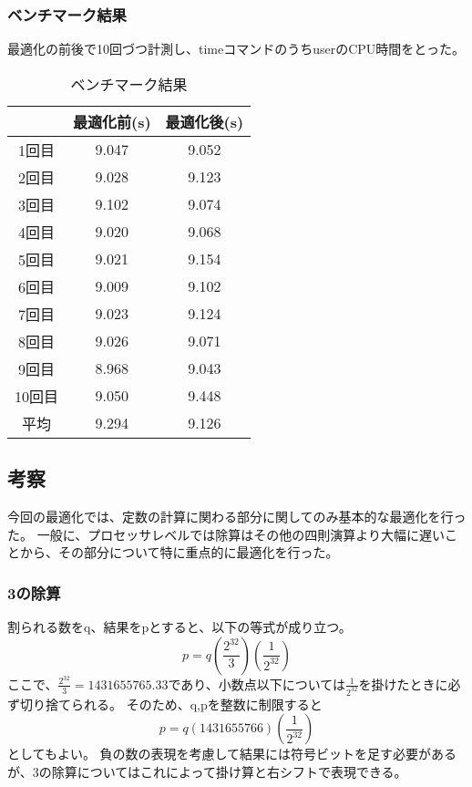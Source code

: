 \subsubsection{ベンチマーク結果}
最適化の前後で10回づつ計測し、timeコマンドのうちuserのCPU時間をとった。
\begin{table}[H]
  \centering
  \label{ベンチマーク結果}
  \caption{ベンチマーク結果}
  \begin{tabular}{|c|c|c|}
    \hline
           & 最適化前(s) & 最適化後(s) \\ \hline
    1回目  & 9.047       & 9.052       \\ \hline
    2回目  & 9.028       & 9.123       \\ \hline
    3回目  & 9.102       & 9.074       \\ \hline
    4回目  & 9.020       & 9.068       \\ \hline
    5回目  & 9.021       & 9.154       \\ \hline
    6回目  & 9.009       & 9.102       \\ \hline
    7回目  & 9.023       & 9.124       \\ \hline
    8回目  & 9.026       & 9.071       \\ \hline
    9回目  & 8.968       & 9.043       \\ \hline
    10回目 & 9.050       & 9.448       \\ \hline
    平均   & 9.294       & 9.126       \\ \hline
  \end{tabular}
\end{table}
\subsection{考察}
今回の最適化では、定数の計算に関わる部分に関してのみ基本的な最適化を行った。
一般に、プロセッサレベルでは除算はその他の四則演算より大幅に遅いことから、その部分について特に重点的に最適化を行った。

\subsubsection{3の除算}
割られる数をq、結果をpとすると、以下の等式が成り立つ。
\[p=q\left(\frac{2^{32}}{3}\right)\left(\frac{1}{2^{32}}\right)\]
ここで、\(\frac{2^{32}}{3}=1431655765.33\)であり、小数点以下については\(\frac{1}{2^{32}}\)を掛けたときに必ず切り捨てられる。
そのため、q,pを整数に制限すると
\[p=q\left(1431655766\right)\left(\frac{1}{2^{32}}\right)\]
としてもよい。
負の数の表現を考慮して結果には符号ビットを足す必要があるが、3の除算についてはこれによって掛け算と右シフトで表現できる。

